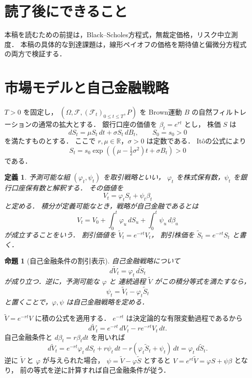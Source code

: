 \documentclass[a5paper,10pt,onecolumn]{jsarticle}
\makeatletter
\theoremstyle{mathnotetheorem}
\newtheorem{definition}[theorem]{定義}
\newtheorem{proposition}[theorem]{命題}
\renewcommand{\proofname}{証明}
\renewenvironment{proof}[1][\proofname]{%
  \par\pushQED{\qed}\normalfont\topsep4\p@\@plus2\p@\relax
  \trivlist\item[\hskip\labelsep\bfseries #1]\ignorespaces
}{\popQED\endtrivlist\@endpefalse}
\makeatother
\begin{document}
\section*{読了後にできること}
本稿を読むための前提は，Black--Scholes方程式，無裁定価格，リスク中立測度．
本稿の具体的な到達課題は，線形ペイオフの価格を期待値と偏微分方程式の両方で検証する．

\section{市場モデルと自己金融戦略}

$T>0$ を固定し，
$(\Omega,\mathcal F,(\mathcal F_t)_{0\le t\le T},P)$ を
Brown運動 $B$ の自然フィルトレーションの通常の拡大とする．
銀行口座の価値を $\beta_t=e^{rt}$ とし，
株価 $S$ は
\begin{equation}\label{eq:stock}
 dS_t=\mu S_t\,dt+\sigma S_t\,dB_t,\qquad S_0=s_0>0
\end{equation}
を満たすものとする．
ここで $r,\mu\in\mathbb R$，$\sigma>0$ は定数である．
It\^oの公式により
\[
 S_t=s_0\exp\!\left(
 (\mu-\tfrac12\sigma^2)t+\sigma B_t\right)>0
\]
である．

\begin{definition}
予測可能な組 $(\varphi_t,\psi_t)$ を取引戦略といい，
$\varphi_t$ を株式保有数，$\psi_t$ を銀行口座保有数と解釈する．
その価値を
\[
 V_t=\varphi_tS_t+\psi_t\beta_t
\]
と定める．
積分が定義可能なとき，戦略が\emph{自己金融}であるとは
\[
 V_t=V_0+\int_0^t\varphi_u\,dS_u
             +\int_0^t\psi_u\,d\beta_u
\]
が成立することをいう．
割引価値を
$\widetilde V_t=e^{-rt}V_t$，
割引株価を $\widetilde S_t=e^{-rt}S_t$ と書く．
\end{definition}

\begin{proposition}[自己金融条件の割引表示]\label{prop:self-finance}
自己金融戦略について
\[
 d\widetilde V_t=\varphi_t\,d\widetilde S_t
\]
が成り立つ．逆に，予測可能な $\varphi$ と
連続過程 $\widetilde V$ がこの積分等式を満たすなら，
\[
 \psi_t=\widetilde V_t-\varphi_t\widetilde S_t
\]
と置くことで，$\varphi,\psi$ は自己金融戦略を定める．
\end{proposition}
\begin{proof}
$\widetilde V=e^{-rt}V$ に積の公式を適用する．
$e^{-rt}$ は決定論的な有限変動過程であるから
\[
 d\widetilde V_t=e^{-rt}\,dV_t-re^{-rt}V_t\,dt.
\]
自己金融条件と $d\beta_t=r\beta_tdt$ を用いれば
\[
 d\widetilde V_t
 =e^{-rt}\varphi_t\,dS_t
  +r\psi_t\,dt-r(\varphi_t\widetilde S_t+\psi_t)\,dt
 =\varphi_t\,d\widetilde S_t.
\]
逆に $\widetilde V$ と $\varphi$ が与えられた場合，
$\psi=\widetilde V-\varphi\widetilde S$ とすると
$V=e^{rt}\widetilde V=\varphi S+\psi\beta$ となり，
前の等式を逆に計算すれば自己金融条件が従う．
\end{proof}
\end{document}
